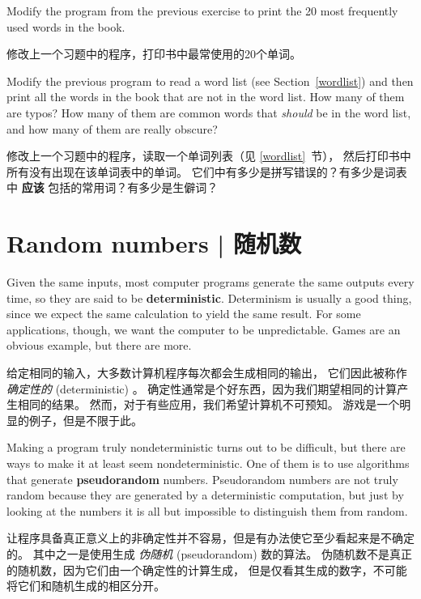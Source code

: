 \begin{exercise}
Modify the program from the previous exercise to print the
20 most frequently used words in the book.

修改上一个习题中的程序，打印书中最常使用的20个单词。
\end{exercise}

\begin{exercise}
Modify the previous program to read a word list (see
Section~\ref{wordlist}) and then print all the words in the book that
are not in the word list.  How many of them are typos?  How many of
them are common words that {\em should} be in the word list, and how
many of them are really obscure?

修改上一个习题中的程序，读取一个单词列表（见 \ref{wordlist}~节），
然后打印书中所有没有出现在该单词表中的单词。
它们中有多少是拼写错误的？有多少是词表中 {\bf 应该} 包括的常用词？有多少是生僻词？
\end{exercise}

\section{Random numbers  |  随机数}
Given the same inputs, most computer programs generate the same
outputs every time, so they are said to be {\bf deterministic}.
Determinism is usually a good thing, since we expect the same
calculation to yield the same result.  For some applications, though,
we want the computer to be unpredictable.  Games are an obvious
example, but there are more.

给定相同的输入，大多数计算机程序每次都会生成相同的输出，
它们因此被称作 {\em 确定性的} (deterministic) 。
确定性通常是个好东西，因为我们期望相同的计算产生相同的结果。
然而，对于有些应用，我们希望计算机不可预知。
游戏是一个明显的例子，但是不限于此。

Making a program truly nondeterministic turns out to be difficult,
but there are ways to make it at least seem nondeterministic.  One of
them is to use algorithms that generate {\bf pseudorandom} numbers.
Pseudorandom numbers are not truly random because they are generated
by a deterministic computation, but just by looking at the numbers it
is all but impossible to distinguish them from random.

让程序具备真正意义上的非确定性并不容易，但是有办法使它至少看起来是不确定的。
其中之一是使用生成 {\em 伪随机} (pseudorandom) 数的算法。
伪随机数不是真正的随机数，因为它们由一个确定性的计算生成，
但是仅看其生成的数字，不可能将它们和随机生成的相区分开。


